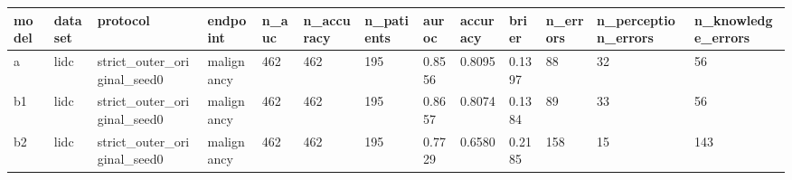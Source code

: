 \begin{tabular}{lllllllllllll}
\hline
model & dataset & protocol & endpoint & n\_auc & n\_accuracy & n\_patients & auroc & accuracy & brier & n\_errors & n\_perception\_errors & n\_knowledge\_errors \\
\hline
a & lidc & strict\_outer\_original\_seed0 & malignancy & 462 & 462 & 195 & 0.8556 & 0.8095 & 0.1397 & 88 & 32 & 56 \\
b1 & lidc & strict\_outer\_original\_seed0 & malignancy & 462 & 462 & 195 & 0.8657 & 0.8074 & 0.1384 & 89 & 33 & 56 \\
b2 & lidc & strict\_outer\_original\_seed0 & malignancy & 462 & 462 & 195 & 0.7729 & 0.6580 & 0.2185 & 158 & 15 & 143 \\
\hline
\end{tabular}

